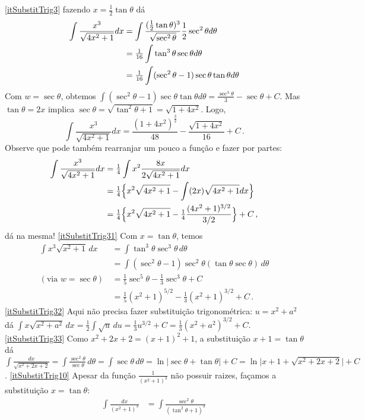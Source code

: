 \begin{Solution}{9.31}
\eqref{itSubstitTrig3}
fazendo $x=\tfrac12\tan \theta$ dá
\begin{align*}
 \int \frac{x^3}{\sqrt{4x^2+1}}dx&=\int \frac{(\tfrac12 \tan
\theta)^3}{\sqrt{\sec^2\theta}}
\frac{1}{2}\sec^2\theta d\theta\\
&=\tfrac{1}{16} \int\tan^3\theta \sec\theta d\theta\\
&=\tfrac{1}{16} \int (\sec^2\theta-1)\sec\theta \tan\theta d\theta
\end{align*}
Com $w=\sec \theta$, obtemos
$\int (\sec^2\theta-1)\sec\theta \tan\theta
d\theta=\frac{\sec^3\theta}{3}-{\sec\theta}+C$.
Mas $\tan \theta=2x$ implica $\sec \theta=\sqrt{\tan^2\theta+1}=\sqrt{1+4x^2}$.
Logo,
$$
\int \frac{x^3}{\sqrt{4x^2+1}}dx=\frac{(1+4x^2)^{\frac{3}{2}}}{48}
-\frac{\sqrt{1+4x^2}}{16}+C\,.
$$
Observe que pode também rearranjar um pouco a função e fazer por partes:
\begin{align*}
 \int \frac{x^3}{\sqrt{4x^2+1}}dx&=
 \tfrac14\int x^2\frac{8x}{2\sqrt{4x^2+1}}dx\\
&=\tfrac14\Bigl\{x^2\sqrt{4x^2+1}-\int (2x)\sqrt{4x^2+1}dx\Bigr\}\\
&=\tfrac14\Bigl\{x^2\sqrt{4x^2+1}-\tfrac14\frac{(4x^2+1)^{3/2}}{3/2}\Bigr\}+C\,,
\end{align*}
dá na mesma!
\eqref{itSubstitTrig31} Com $x=\tan \theta$, temos
\begin{align*}
\int x^3\sqrt{x^2+1}\,dx&=\int \tan^3\theta\sec^3\theta\,d\theta\\
&=\int (\sec^2\theta-1)\sec^2\theta(\tan\theta\sec\theta)\,d\theta\\
(\text{via }w=\sec\theta)\,
&=\tfrac15\sec^5\theta-\tfrac13\sec^3\theta+C\\
&=\tfrac15(x^2+1)^{5/2}-\tfrac13(x^2+1)^{3/2}+C\,.
\end{align*}
\eqref{itSubstitTrig32} Aqui não precisa fazer substituição trigonométrica:
$u=x^2+a^2$ dá $\int
x\sqrt{x^2+a^2}\,dx=\tfrac12\int\sqrt{u}\,du=\tfrac13u^{3/2}+C=
\tfrac13(x^2+a^2)^{3/2}+C$.
\eqref{itSubstitTrig33} Como $x^2+2x+2=(x+1)^2+1$, a substituição
$x+1=\tan\theta$ dá
$\int
\frac{dx}{\sqrt{x^2+2x+2}}=\int\frac{\sec^2\theta}{\sec\theta}\,
d\theta=\int\sec\theta\,d\theta=\ln|\sec\theta+\tan\theta|+C=\ln\bigl|x+1+\sqrt{
x^2+2x+2}\bigr|+C$.
\eqref{itSubstitTrig10} Apesar da função $\frac{1}{(x^2+1)^3}$ não possuir
raizes, façamos a substituição $x=\tan\theta$:
\begin{align*}
\int\frac{dx}{(x^2+1)^3}&=\int\frac{\sec^2\theta}{(\tan^2\theta+1)^3}\,

\end{align*}
\end{Solution}
